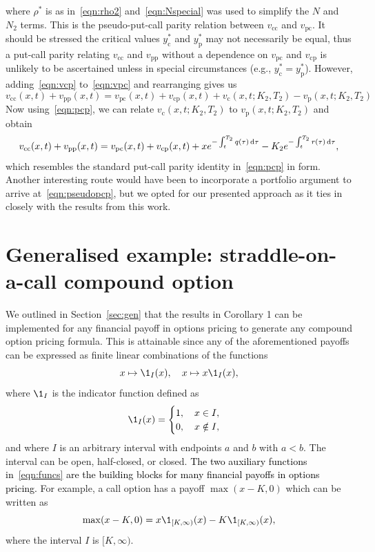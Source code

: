 where $\rho^*$ is as in~\eqref{eqn:rho2} and~\eqref{eqn:Nspecial} was used to simplify the $N$ and $N_2$ terms. This is the pseudo-put-call parity relation between $v_\text{cc}$ and $v_\text{pc}$. It should be stressed the critical values $y_\text{c}^*$ and $y_\text{p}^*$ may not necessarily be equal, thus a put-call parity relating $v_\text{cc}$ and $v_\text{pp}$ without a dependence on $v_\text{pc}$ and $v_\text{cp}$ is unlikely to be ascertained unless in special circumstances (e.g., $y_\text{c}^* = y_\text{p}^*$). However, adding~\eqref{eqn:vcp} to~\eqref{eqn:vpc} and rearranging gives us
	\begin{equation*}
		v_\text{cc}(x,t) + v_\text{pp}(x,t) = v_\text{pc}(x,t) + v_\text{cp}(x,t) + v_\text{c}(x,t; K_2, T_2) - v_\text{p}(x,t; K_2, T_2)
	\end{equation*}
Now using~\eqref{eqn:pcp}, we can relate $v_\text{c}(x,t; K_2, T_2)$ to $v_\text{p}(x,t; K_2, T_2)$ and obtain
	\begin{equation}
		\label{eqn:pseudopcp}
		v_\text{cc}(x,t) + v_\text{pp}(x,t) =  v_\text{pc}(x,t) + v_\text{cp}(x,t) + xe^{-\int_t^{T_2} q(\tau) \, \mathrm d\tau} - K_2e^{-\int_t^{T_2} r(\tau) \, \mathrm d\tau},
	\end{equation}
which resembles the standard put-call parity identity in~\eqref{eqn:pcp} in form. Another interesting route would have been to incorporate a portfolio argument to arrive at~\eqref{eqn:pseudopcp}, but we opted for our presented approach as it ties in closely with the results from this work.

\section{Generalised example: straddle-on-a-call compound option}
We outlined in Section~\ref{sec:gen} that the results in Corollary 1 can be implemented for any financial payoff in options pricing to generate any compound option pricing formula. This is attainable since any of the aforementioned payoffs can be expressed as finite linear combinations of the functions
	\begin{equation}
		\label{eqn:funcs}
		x \mapsto \1_I(x), \quad x \mapsto x\1_I(x),
	\end{equation}
where $\1_I$ is the indicator function defined as
	\begin{equation*}
		\1_I(x) = \begin{cases}
			1, \quad x \in I, \\
			0, \quad x \notin I,
		\end{cases}
	\end{equation*}
and where $I$ is an arbitrary interval with endpoints $a$ and $b$ with $a < b$. The interval can be open, half-closed, or closed. \textcolor{black}{The two auxiliary functions in~\eqref{eqn:funcs} are the building blocks for many financial payoffs in options pricing.} For example, a call option has a payoff $\max(x-K,0)$ which can be written as
	\begin{equation*}
		\max(x-K,0) = x\1_{[K,\infty)}(x) - K\1_{[K,\infty)}(x),
	\end{equation*}
where the interval $I$ is $[K,\infty)$.

